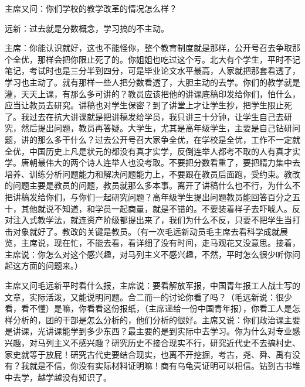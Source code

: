 主席又问：你们学校的教学改革的情况怎么样？

远新：过去就是分数概念，学习搞的不主动。

主席：你能认识就好，这也不能怪你，整个教育制度就是那样，公开号召去争取那个全优，那样会把你限止死了的。你姐姐也吃过这个亏。北大有个学生，平时不记笔记，考试时也是三分半到四分，可是毕业论文水平最高，人家就把那套看透了，学习也主动了。就有那样一些人把分数看透了，大胆主动的去学。你们的教学就是灌，天天上课，有那么多可讲的？教员应该把他的讲课底稿印发给你们，怕什么，应当让教员去研究。讲稿也对学生保密？到了讲堂上才让学生抄，把学生限止死了。我过去在抗大讲课就是把讲稿发给学员，我只讲三十分钟，让学生自己去研究，然后提出问题，教员再答疑。大学生，尤其是高年级学生，主要是自己钻研问题，讲的那么多干什么？过去公开号召大家争全优，在学校是全优，工作不一定就全优，中国历史上凡是状元的都没有真才实学，反倒连举人都考不取的人有真才实学。唐朝最伟大的两个诗人连举人也没考取。不要把分数看重了，要把精力集中去培养、训练分析问题能力和解决问题能力上，不要跟在教员后面跑，受约束。教改的问题主要是教员的问题，教员就那么多本事。离开了讲稿什么也不行，为什么不把讲稿发给你们，与你们一起研究问题？高年级学生提出问题教员能回答百分之五十，其他就说不知道，和学员一起商量，就是不错的。不要装着样子去吓唬人。反对注入式教学法，就连资产阶级都提出来了，我们为什么不反，只要不把学生当打击对象就好了。教改的关键是教员。（有一次毛远新动员毛主席去看科学成就展览，主席说，现在忙，不能去看，看详细了没有时间，走马观花又没意思。接着，主席说：你怎么对这个感兴趣，对马列主义不感兴趣，不然，平时怎么很少听你问起这方面的问题来。）

主席又问毛远新平时看什么报，主席说：要看解放军报，中国青年报工人战士写的文章，实际活泼，又能说明问题。合二而一的讨论你看了吗？（毛远新说：很少看，看不懂）是嘛，你看看这份报纸，（主席递给一份中国青年报），你看工人是怎样分析的，团的干部是怎么分析的，他们分析的很好。主席又说：你们政治课主要是讲课，光讲课能学到多少东西？最主要的是到实际中去学习。你为什么对专业感兴趣，对马列主义不感兴趣？研究历史不接合现实不行，研究近代史不去搞村史、家史就等于放屁！研究古代史要结合现实，也离不开挖掘，考古，尧、舜、禹有没有？我就是不信，你没有实际材料证明嘛！商有乌龟壳证明可以相信。钻到古书堆中去学，越学越没有知识了。

